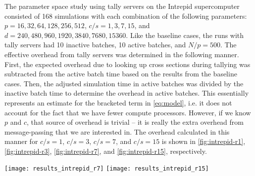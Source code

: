 \documentclass[3p]{elsarticle}
\begin{document}
The parameter space study using tally servers on the Intrepid supercomputer
consisted of 168 simulations with each combination of the following parameters:
$p = 16,32,64,128,256,512$, $c/s = 1,3,7,15$, and $d = 240, 480, 960, 1920,
3840, 7680, 15360$. Like the baseline cases, the runs with tally servers had 10
inactive batches, 10 active batches, and $N/p = 500$. The effective overhead
from tally servers was determined in the following manner. First, the expected
overhead due to looking up cross sections during tallying was subtracted from
the active batch time based on the results from the baseline cases. Then, the
adjusted simulation time in active batches was divided by the inactive batch
time to determine the overhead in active batches. This essentially represents an
estimate for the bracketed term in \eqref{eq:model}, i.e. it does not account
for the fact that we have fewer compute processors. However, if we know $p$ and
$c$, that source of overhead is trivial -- it is really the extra overhead from
message-passing that we are interested in. The overhead calculated in this
manner for $c/s = 1$, $c/s = 3$, $c/s = 7$, and $c/s = 15$ is shown in
\autoref{fig:intrepid-r1}, \autoref{fig:intrepid-r3}, \autoref{fig:intrepid-r7},
and \autoref{fig:intrepid-r15}, respectively.

\begin{figure*}[!th]
  \begin{floatrow}
     {\texttt{[image: results\_intrepid\_r7]}}
     {\texttt{[image: results\_intrepid\_r15]}}
  \end{floatrow}
\end{figure*}
\end{document}
